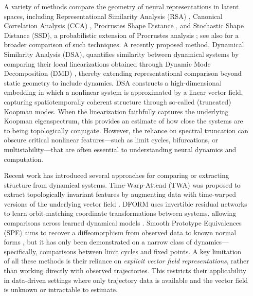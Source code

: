 \documentclass{article}
\theoremstyle{definition} \newtheorem{definition}{Definition}  \newtheorem{example}{Example}
\theoremstyle{remark} \newtheorem{remark}{Remark}
\newcounter{ct}
\begin{document}
A variety of methods compare the geometry of neural representations in latent spaces, including Representational Similarity Analysis (RSA) \citep{kriegeskorte2008representational}, Canonical Correlation Analysis (CCA) \citep{raghu2017svcca}, Procrustes Shape Distance \citep{williams2021generalized}, and Stochastic Shape Distance (SSD), a probabilistic extension of Procrustes analysis \citep{duong2022representational, barbosa2025quantifying}; see also \citep{williams2024equivalence} for a broader comparison of such techniques.
A recently proposed method, Dynamical Similarity Analysis (DSA), quantifies similarity between dynamical systems by comparing their local linearizations obtained through Dynamic Mode Decomposition (DMD) \citep{ostrow2024beyond}, thereby extending representational comparison beyond static geometry to include dynamics.
DSA constructs a high-dimensional embedding in which a nonlinear system is approximated by a linear vector field, capturing spatiotemporally coherent structure through so-called (truncated) Koopman modes. 
When the linearization faithfully captures the underlying Koopman eigenspectrum, this provides an estimate of how close the systems are to being topologically conjugate. 
However, the reliance on spectral truncation can obscure critical nonlinear features---such as limit cycles, bifurcations, or multistability---that are often essential to understanding neural dynamics and computation.

Recent work has introduced several approaches for comparing or extracting structure from dynamical systems.
Time-Warp-Attend (TWA) was proposed to extract topologically invariant features by augmenting data with time-warped versions of the underlying vector field \citep{moriel2024timewarpattend}. DFORM uses invertible residual networks to learn orbit-matching coordinate transformations between systems, allowing comparisons across learned dynamical models \citep{chen2024dform}. %
Smooth Prototype Equivalences (SPE) aims to recover a diffeomorphism from observed data to known normal forms \citep{friedman2025characterizing}, but it has only been demonstrated on a narrow class of dynamics---specifically, comparisons between limit cycles and fixed points.
A key limitation of all these methods is their reliance on \emph{explicit vector field representations}, rather than working directly with observed trajectories.
This restricts their applicability in data-driven settings where only trajectory data is available and the vector field is unknown or intractable to estimate.
\end{document}
